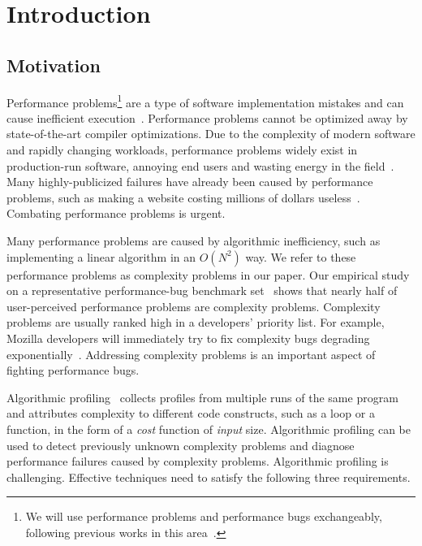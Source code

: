 \section{Introduction}
\label{sec:intro}

\subsection{Motivation}
\label{sec:motiv}

Performance problems\footnote{We will use performance problems and performance bugs exchangeably, 
following previous works in this area~\cite{SongOOPSLA2014,ldoctor}.} 
are a type of software implementation mistakes
and can cause inefficient execution~\cite{PerfBug,perf.fse10,SongOOPSLA2014,ldoctor,Alabama}. 
Performance problems cannot be optimized away by state-of-the-art compiler optimizations.
Due to the complexity of modern software and rapidly changing workloads, 
performance problems widely exist in production-run software, 
annoying end users and wasting energy in the field~\cite{PerfBug,SongOOPSLA2014,ldoctor}. 
Many highly-publicized failures have already been caused by performance problems, 
such as making a website costing millions of dollars useless~\cite{ACA-health}.
Combating performance problems is urgent. 

Many performance problems are caused by algorithmic inefficiency, 
such as implementing a linear algorithm in an $O(N^2)$ way.
We refer to these performance problems as complexity problems in our paper.
Our empirical study on a representative performance-bug 
benchmark set~\cite{PerfBug,SongOOPSLA2014} shows that 
nearly half of user-perceived performance problems are complexity problems. 
Complexity problems are usually ranked high in a developers' priority list. 
For example, Mozilla developers will immediately try to fix complexity bugs degrading exponentially~\cite{mozilla35294}. 
Addressing complexity problems is an important aspect of fighting performance bugs. 


Algorithmic profiling~\cite{Aprof1,Aprof2,AlgoProf} collects profiles from multiple 
runs of the same program and attributes complexity to different code constructs, such as a loop or a function,
in the form of a \textit{cost} function of \textit{input} size. 
Algorithmic profiling can be used to detect previously unknown complexity problems and 
diagnose performance failures caused by complexity problems. 
Algorithmic profiling is challenging. 
Effective techniques need to satisfy the following three requirements.


